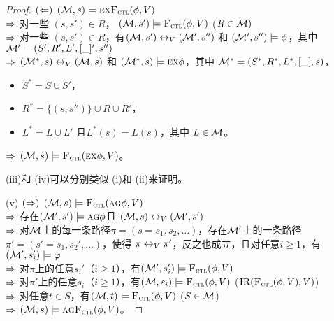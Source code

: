 \begin{proof}
	$(\Leftarrow)$ $({\cal M},s)\models\textsc{e} \textsc{x}{\textsc{F}_{\textsc{ctl}}}(\phi,V)$\\
	$\Rightarrow$ 对一些 $(s,s')\in R$， $({\cal M},s')\models{\textsc{F}_{\textsc{ctl}}}(\phi,V)$ ($R\in {\cal M})$\\
	$\Rightarrow$ 对一些 $(s,s')\in R$，有$({\cal M},s')\leftrightarrow_V({\cal M}',s'')$ 和 $({\cal M}',s'')\models\phi$，其中 ${\cal M}'=(S',R',L',[\_]',s'')$ \\
	$\Rightarrow$ $({\cal M}^*,s)\leftrightarrow_V({\cal M},s)$ 和 $({\cal M}^*,s)\models\textsc{e}\textsc{x}\phi$，其中
	${\cal M}^*=(S^*,R^*,L^*,[\_], s)$，
	\begin{itemize}
		\item $S^*=S\cup S'$，
		\item $R^*=\{(s,s'')\}\cup R \cup R'$，
		\item $L^*= L \cup L'$ 且$L^*(s)=L(s)$，其中 $L\in{\cal M}$。
	\end{itemize}
	$\Rightarrow$ $({\cal M},s)\models {\textsc{F}_{\textsc{ctl}}}(\textsc{e}\textsc{x}\phi,V)$。
	
	
	
	
	(iii)和 (iv)可以分别类似 (i)和 (ii)来证明。
	
	(v) $(\Rightarrow)$ $({\cal M},s) \models {\textsc{F}_{\textsc{ctl}}}(\textsc{a} \textsc{g} \phi, V)$\\
	$\Rightarrow$ 存在$({\cal M}',s') \models \textsc{a} \textsc{g} \phi$且 $({\cal M},s) \leftrightarrow_V ({\cal M}',s')$\\
	$\Rightarrow$ 对${\cal M}$上的每一条路径$\pi=(s=s_1, s_2, \dots)$，存在${\cal M}'$上的一条路径$\pi'=(s'=s_1, s_2', \dots)$，使得 $\pi \leftrightarrow_V \pi'$，反之也成立，且对任意$i\geq 1$，有$({\cal M}', s_i') \models \varphi$\\ 
	$\Rightarrow$ 对$\pi$上的任意$s_i'$（$i\geq 1$），有$({\cal M}',s_i') \models {\textsc{F}_{\textsc{ctl}}}(\phi, V)$\\
	$\Rightarrow$ 对$\pi'$上的任意$s_i$（$i\geq 1$），有$({\cal M},s_i) \models {\textsc{F}_{\textsc{ctl}}}(\phi, V)$ \hfill ($\textrm{IR}({\textsc{F}_{\textsc{ctl}}}(\phi, V), V)$)\\
	$\Rightarrow$ 对任意$t \in S$，有$({\cal M},t) \models {\textsc{F}_{\textsc{ctl}}}(\phi, V)$ \hfill ($S\in {\cal M}$)\\
	$\Rightarrow$ $({\cal M},s) \models \textsc{a} \textsc{g} {\textsc{F}_{\textsc{ctl}}}(\phi, V)$。
	

\end{proof}
